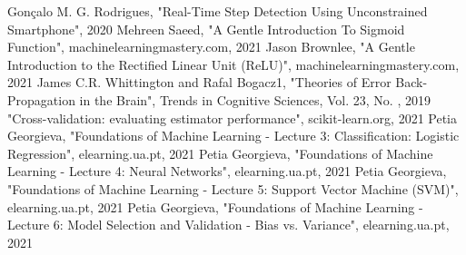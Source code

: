 \documentclass[conference]{IEEEtran}
\begin{document}
\begin{thebibliography}{00}
 Gonçalo M. G. Rodrigues, "Real-Time Step Detection Using Unconstrained Smartphone", 2020
 Mehreen Saeed, "A Gentle Introduction To Sigmoid Function", machinelearningmastery.com, 2021
 Jason Brownlee, "A Gentle Introduction to the Rectified Linear Unit (ReLU)", machinelearningmastery.com, 2021
 James C.R. Whittington and Rafal Bogacz1, "Theories of Error Back-Propagation in the Brain", Trends in Cognitive Sciences, Vol. 23, No. , 2019
 "Cross-validation: evaluating estimator performance", scikit-learn.org, 2021
 Petia Georgieva, "Foundations of Machine Learning - Lecture 3: Classification: Logistic Regression", elearning.ua.pt, 2021
 Petia Georgieva, "Foundations of Machine Learning - Lecture 4: Neural Networks", elearning.ua.pt, 2021
 Petia Georgieva, "Foundations of Machine Learning - Lecture 5: Support Vector Machine (SVM)", elearning.ua.pt, 2021
 Petia Georgieva, "Foundations of Machine Learning - Lecture 6: Model Selection and Validation - Bias vs. Variance", elearning.ua.pt, 2021

\end{thebibliography}
\end{document}
